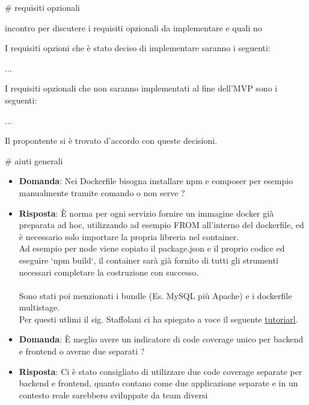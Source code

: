 
# requisiti opzionali

incontro per discutere i requisiti opzionali da implementare e quali no

I requisiti opzioni che è stato deciso di implementare saranno i seguenti:

...

I requisiti opzionali che non saranno implementati al fine dell'MVP sono i seguenti:

...

Il propontente si è trovato d'accordo con queste decisioni.


# aiuti generali

\begin{itemize}
\item \textbf{Domanda}: Nei Dockerfile bisogna installare npm e composer per esempio manualmente tramite comando o non serve ? 
\item \textbf{Risposta}: È norma per ogni servizio fornire un immagine docker già preparata ad hoc, utilizzando ad esempio FROM all'interno del dockerfile, ed è necessario solo importare la propria libreria nel container. \\ Ad esempio per node viene copiato il package.json e il proprio codice ed eseguire `npm build`, il container sarà già fornito di tutti gli strumenti necessari completare la costruzione con successo. \\ \\ Sono stati poi menzionati i bundle (Es. MySQL più Apache) e i dockerfile multistage. \\ Per questi utlimi il sig. Staffolani ci ha spiegato a voce il seguente \href{https://medium.com/@mohamedbenkhemiswork576/how-to-dockerize-a-react-app-with-multi-stage-build-and-nginx-minimize-react-image-size-by-80-33a09ae20118}{tutoriarl}.
\end{itemize}

\begin{itemize}
\item \textbf{Domanda}: È meglio avere un indicatore di code coverage unico per backend e frontend o averne due separati ?
\item \textbf{Risposta}: Ci è stato consigliato di utilizzare due code coverage separate per backend e frontend, quanto contano come due applicazione separate e in un contesto reale sarebbero sviluppate da team diversi
\end{itemize}
